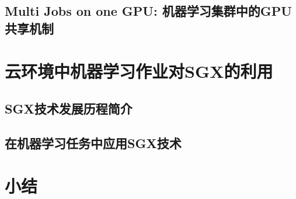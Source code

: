 \subsection{Multi Jobs on one GPU: 机器学习集群中的GPU共享机制}
\section{云环境中机器学习作业对SGX的利用}

\subsection{SGX技术发展历程简介}

\subsection{在机器学习任务中应用SGX技术}

\section{小结}
